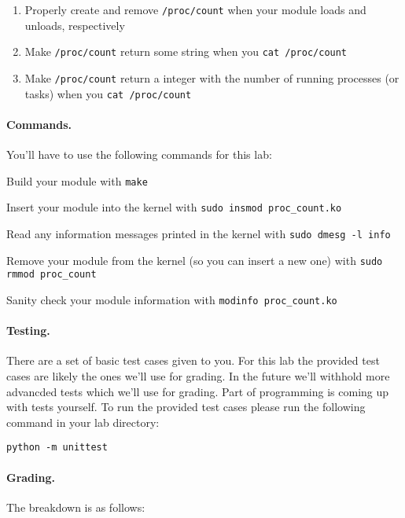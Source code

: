 \begin{enumerate}
  \item Properly create and remove \lstinline|/proc/count| when your module
        loads and unloads, respectively
  \item Make \lstinline|/proc/count| return some string when you
        \lstinline|cat /proc/count|
  \item Make \lstinline|/proc/count| return a integer with the number of running
        processes (or tasks) when you \lstinline|cat /proc/count|
\end{enumerate}

\paragraph{Commands.}

You'll have to use the following commands for this lab:

Build your module with \lstinline|make|

Insert your module into the kernel with \lstinline|sudo insmod proc_count.ko|

Read any information messages printed in the kernel with
\lstinline|sudo dmesg -l info|

Remove your module from the kernel (so you can insert a new one) with
\lstinline|sudo rmmod proc_count|

Sanity check your module information with \lstinline|modinfo proc_count.ko|

\paragraph{Testing.}

There are a set of basic test cases given to you.
For this lab the provided test cases are likely the ones we'll use for grading.
In the future we'll withhold more advancded tests which we'll use for grading.
Part of programming is coming up with tests yourself.
To run the provided test cases please run the following command in your lab
directory:

\begin{lstlisting}[xleftmargin=2em]
python -m unittest
\end{lstlisting}

\paragraph{Grading.}

The breakdown is as follows:

